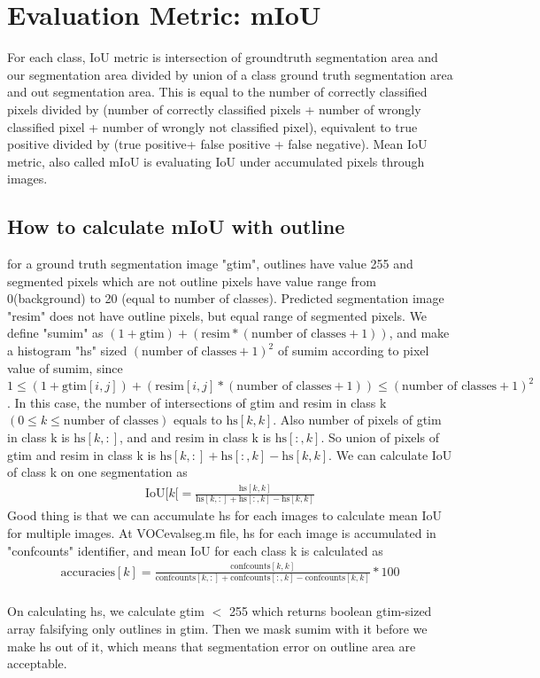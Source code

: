 \documentclass{article}
\begin{document}
\section{Evaluation Metric: mIoU}
For each class, IoU metric is intersection of groundtruth segmentation area and our segmentation area divided by union of a class ground truth segmentation area and out segmentation area. This is equal to the number of correctly classified pixels divided by (number of correctly classified pixels + number of wrongly classified pixel + number of wrongly not classified pixel), equivalent to true positive divided by (true positive+ false positive + false negative). Mean IoU metric, also called mIoU is evaluating IoU under accumulated pixels through images.
\subsection{How to calculate mIoU with outline}
for a ground truth segmentation image "gtim", outlines have value 255 and segmented pixels which are not outline pixels have value range from 0(background) to 20 (equal to number of classes).  Predicted segmentation image "resim" does not have outline pixels, but equal range of segmented pixels. We define "sumim" as $(1 + \text{gtim}) + (\text{resim} * (\text{number of classes} + 1))$, and make a histogram "hs" sized $(\text{number of classes} + 1)^2$ of sumim according to pixel value of sumim, since $1 \le (1+\text{gtim}[i,j]) + (\text{resim}[i,j] * (\text{number of classes} + 1)) \le (\text{number of classes} + 1)^2$. In this case, the number of intersections of gtim and resim in class k $(0 \le k \le \text{number of classes})$ equals to $\text{hs}[k,k]$. Also number of pixels of gtim in class k is $\text{hs}[k,:]$, and and resim in class k is $\text{hs}[:,k]$. So union of pixels of gtim and resim in class k is $\text{hs}[k,:] + \text{hs}[:,k] - \text{hs}[k,k]$. We can calculate IoU of class k on one segmentation as 
\begin{align*}
\text{IoU}[k[ = \frac{\text{hs}[k,k]}{ \text{hs}[k,:] + \text{hs}[:,k] - \text{hs}[k,k]}
\end{align*}
 Good thing is that we can accumulate hs for each images to calculate mean IoU for multiple images. At VOCevalseg.m file, hs for each image is accumulated in "confcounts" identifier, and mean IoU for each class k is calculated as 
\begin{align*}
\text{accuracies}[k] = \frac{\text{confcounts}[k,k]}{\text{confcounts}[k,:] + \text{confcounts}[:,k] - \text{confcounts}[k,k]} * 100
\end{align*} \\
On calculating hs, we calculate gtim $<$ 255 which returns boolean gtim-sized array falsifying only outlines in gtim. Then we mask sumim with it before we make hs out of it,  which means that segmentation error on outline area are acceptable.
\end{document}
